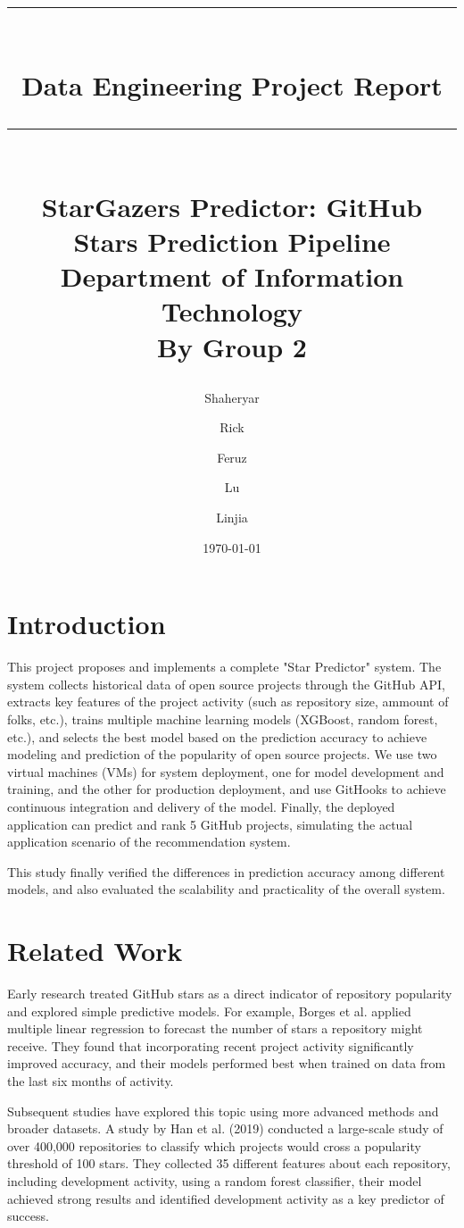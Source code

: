 \documentclass[12pt,a4paper]{article}
\title{

    \rule{\textwidth}{4pt}\\[10pt]
    \huge \textbf{Data Engineering Project Report}
    \rule{\textwidth}{1pt}\\[15pt]
    
    \huge \color{darkgray}\textbf{StarGazers Predictor: GitHub Stars Prediction Pipeline}\\[15pt]
    
    \large \textbf{Department of Information Technology}\\[15pt]
    \large \textbf{By Group 2}\\[5pt]
}
\author{
    Shaheryar\\ 
    \and
    Rick\\
    \and
    Feruz\\
    \and
    Lu\\
    \and
    Linjia\\
    }
\date{\today} %
\begin{document}
\maketitle

\section{Introduction}
This project proposes and implements a complete "Star Predictor" system. The system collects historical data of open source projects through the GitHub API, extracts key features of the project activity (such as repository size, ammount of folks, etc.), trains multiple machine learning models (XGBoost, random forest, etc.), and selects the best model based on the prediction accuracy to achieve modeling and prediction of the popularity of open source projects. We use two virtual machines (VMs) for system deployment, one for model development and training, and the other for production deployment, and use GitHooks to achieve continuous integration and delivery of the model. Finally, the deployed application can predict and rank 5 GitHub projects, simulating the actual application scenario of the recommendation system.

This study finally verified the differences in prediction accuracy among different models, and also evaluated the scalability and practicality of the overall system.

\section{Related Work}
Early research treated GitHub stars as a direct indicator of repository popularity and explored simple predictive models. For example, Borges et al.\cite{3} applied multiple linear regression to forecast the number of stars a repository might receive. They found that incorporating recent project activity significantly improved accuracy, and their models performed best when trained on data from the last six months of activity. 

Subsequent studies have explored this topic using more advanced methods and broader datasets. A study by Han et al. (2019) conducted a large-scale study of over 400,000 repositories to classify which projects would cross a popularity threshold of 100 stars. They collected 35 different features about each repository, including development activity, using a random forest classifier, their model achieved strong results and identified development activity as a key predictor of success.\cite{1}  
\end{document}
